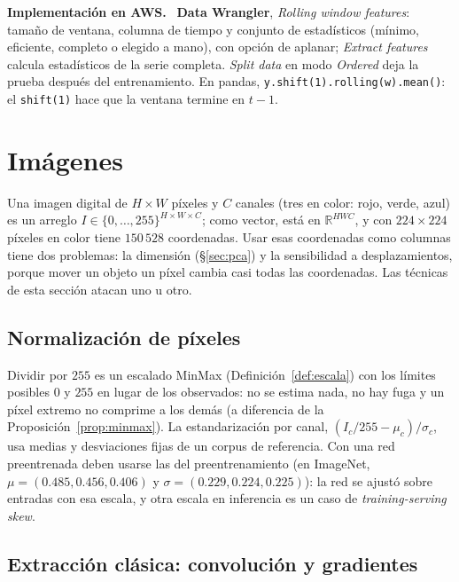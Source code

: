 \documentclass[11pt,a4paper]{article}
\theoremstyle{plain}
\theoremstyle{definition}
\theoremstyle{remark}
\newcommand{\R}{\mathbb{R}}
\newcommand{\1}{\mathbf{1}}
\newenvironment{aws}{\par\medskip\sloppy\noindent\textbf{Implementación en AWS.}\ }{\par\medskip}
\begin{document}
\begin{aws}
\textbf{Data Wrangler}, \emph{Rolling window features}: tamaño de ventana,
columna de tiempo y conjunto de estadísticos (mínimo, eficiente, completo
o elegido a mano), con opción de aplanar; \emph{Extract features} calcula
estadísticos de la serie completa. \emph{Split data} en modo
\emph{Ordered} deja la prueba después del entrenamiento. En pandas,
\texttt{y.shift(1).rolling(w).mean()}: el \texttt{shift(1)} hace que la
ventana termine en $t-1$.
\end{aws}

\section{Imágenes}

Una imagen digital de $H\times W$ píxeles y $C$ canales (tres en color:
rojo, verde, azul) es un arreglo $I\in\{0,\dots,255\}^{H\times W\times C}$;
como vector, está en $\R^{HWC}$, y con $224\times224$ píxeles en color
tiene $150\,528$ coordenadas. Usar esas coordenadas como columnas tiene dos
problemas: la dimensión (\S\ref{sec:pca}) y la sensibilidad a
desplazamientos, porque mover un objeto un píxel cambia casi todas las
coordenadas. Las técnicas de esta sección atacan uno u otro.

\subsection{Normalización de píxeles}

Dividir por $255$ es un escalado MinMax (Definición~\ref{def:escala}) con
los límites posibles $0$ y $255$ en lugar de los observados: no se estima
nada, no hay fuga y un píxel extremo no comprime a los demás (a
diferencia de la Proposición~\ref{prop:minmax}). La estandarización por
canal, $(I_c/255-\mu_c)/\sigma_c$, usa medias y desviaciones fijas de un
corpus de referencia. Con una red preentrenada deben usarse las del
preentrenamiento (en ImageNet, $\mu=(0.485,0.456,0.406)$ y
$\sigma=(0.229,0.224,0.225)$): la red se ajustó sobre entradas con esa
escala, y otra escala en inferencia es un caso de \emph{training-serving
skew}.

\subsection{Extracción clásica: convolución y gradientes}
\end{document}
